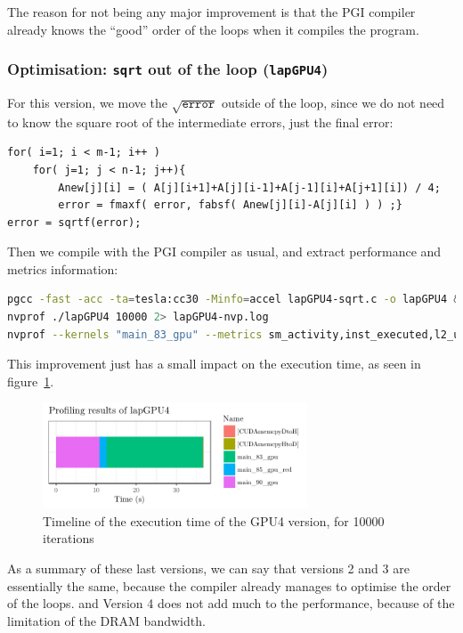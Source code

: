 The reason for not being any major improvement is that the PGI compiler already knows the “good” order of the loops when it compiles the program.

\subsubsection{Optimisation: \texttt{sqrt} out of the loop (\texttt{lapGPU4})}
For this version, we move the $\sqrt{\texttt{error}}$ outside of the loop, since we do not need to know the square root of the intermediate errors, just the final error:
\begin{lstlisting}[firstnumber=82]
for( i=1; i < m-1; i++ )
	for( j=1; j < n-1; j++){
		Anew[j][i] = ( A[j][i+1]+A[j][i-1]+A[j-1][i]+A[j+1][i]) / 4;
		error = fmaxf( error, fabsf( Anew[j][i]-A[j][i] ) ) ;}
error = sqrtf(error);
\end{lstlisting}

Then we compile with the PGI compiler as usual, and extract performance and metrics information:
\begin{lstlisting}[language=bash]
pgcc -fast -acc -ta=tesla:cc30 -Minfo=accel lapGPU4-sqrt.c -o lapGPU4 &> lapGPU4-comp.log
nvprof ./lapGPU4 10000 2> lapGPU4-nvp.log
nvprof --kernels "main_83_gpu" --metrics sm_activity,inst_executed,l2_utilization, dram_utilization,dram_read_throughput,dram_write_throughput,ipc ./lapGPU4 100 2> lapGPU4-metrics.log
\end{lstlisting}

This improvement just has a small impact on the execution time, as seen in figure~\ref{fig:timeline-gpu4}.
\begin{figure}[H]
	\centering
	\includegraphics[width=0.7\textwidth]{images/timeline-gpu4}
	\caption{Timeline of the execution time of the GPU4 version, for \num{10000} iterations}
	\label{fig:timeline-gpu4}
\end{figure}

As a summary of these last versions, we can say that versions 2 and 3 are essentially the same, because the compiler already manages to optimise the order of the loops. and Version 4 does not add much to the performance, because of the limitation of the DRAM bandwidth.

